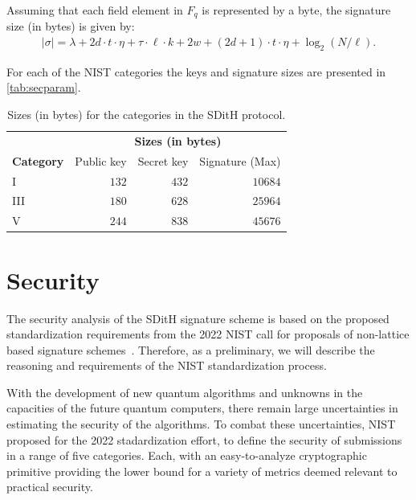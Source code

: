 \documentclass[11pt]{report}
\theoremstyle{definition}
\theoremstyle{plain}
\begin{document}
Assuming that each field element in $F_q$ is represented by a byte, the signature size (in bytes) is given by:
\begin{align*}
  |\sigma| =
  \lambda + 2d \cdot t \cdot \eta + \tau \cdot \ell \cdot k + 2w + (2d + 1) \cdot t \cdot \eta + \log_2(N / \ell).
\end{align*}

For each of the NIST categories the keys and signature sizes are presented in \autoref{tab:secparam}.

\begin{table}[H]
  \centering
  \begin{tabular}{|l|r|r|r|}
    \hline
                      & \multicolumn{3}{c}{\textbf{Sizes (in bytes)}}                                \\
    \textbf{Category} & Public key                                    & Secret key & Signature (Max) \\
    \hline
    I                 & $132$                                         & $432$      & $10684$         \\
    III               & $180$                                         & $628$      & $25964$         \\
    V                 & $244$                                         & $838$      & $45676$         \\
    \hline
  \end{tabular}
  \caption{Sizes (in bytes) for the categories in the SDitH protocol.}
  \label{tab:sizes}
\end{table}

\section{Security}

The security analysis of the SDitH signature scheme is based on the proposed standardization requirements from the 2022 NIST call for proposals of non-lattice based signature schemes~\cite{nistcall}. Therefore, as a preliminary, we will describe the reasoning and requirements of the NIST standardization process.

With the development of new quantum algorithms and unknowns in the capacities of the future quantum computers, there remain large uncertainties in estimating the security of the algorithms. To combat these uncertainties, NIST proposed for the 2022 stadardization effort, to define the security of submissions in a range of five categories. Each, with an easy-to-analyze cryptographic primitive providing the lower bound for a variety of metrics deemed relevant to practical security.
\end{document}
